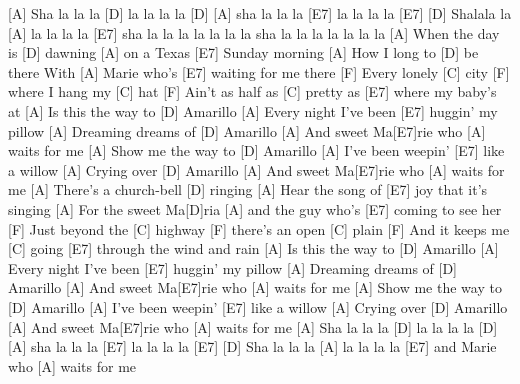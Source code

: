 [A] Sha la la la [D] la la la la [D] [A] sha la la la [E7] la la la la [E7] [D] 
Shalala la [A] la la la la [E7] sha la la la la la la la sha la la la la la la la 
[A] When the day is [D] dawning [A] on a Texas [E7] Sunday morning 
[A] How I long to [D] be there 
With [A] Marie who's [E7] waiting for me there 
[F] Every lonely [C] city [F] where I hang my [C] hat 
[F] Ain't as half as [C] pretty as [E7] where my baby's at 
[A] Is this the way to [D] Amarillo 
[A] Every night I've been [E7] huggin' my pillow 
[A] Dreaming dreams of [D] Amarillo 
[A] And sweet Ma[E7]rie who [A] waits for me 
[A] Show me the way to [D] Amarillo 
[A] I've been weepin' [E7] like a willow 
[A] Crying over [D] Amarillo 
[A] And sweet Ma[E7]rie who [A] waits for me 
[A] There's a church-bell [D] ringing 
[A] Hear the song of [E7] joy that it's singing 
[A] For the sweet Ma[D]ria [A] and the guy who's [E7] coming to see her 
[F] Just beyond the [C] highway [F] there's an open [C] plain 
[F] And it keeps me [C] going [E7] through the wind and rain 
[A] Is this the way to [D] Amarillo 
[A] Every night I've been [E7] huggin' my pillow 
[A] Dreaming dreams of [D] Amarillo 
[A] And sweet Ma[E7]rie who [A] waits for me 
[A] Show me the way to [D] Amarillo 
[A] I've been weepin' [E7] like a willow 
[A] Crying over [D] Amarillo 
[A] And sweet Ma[E7]rie who [A] waits for me 
[A] Sha la la la [D] la la la la [D] [A] sha la la la [E7] la la la la [E7] [D] 
Sha la la la [A] la la la la [E7] and Marie who [A] waits for me 